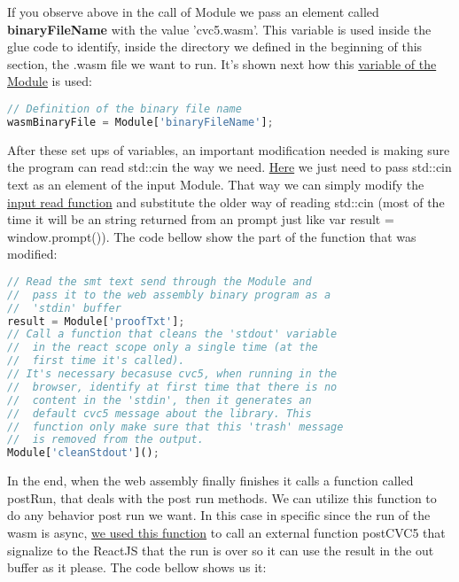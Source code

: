 \documentclass[12pt, a4paper]{article}
\begin{document}
If you observe above in the call of Module we pass an element called \textbf{binaryFileName} with the value ’cvc5.wasm’. This variable is used inside the glue code to identify, inside the directory we defined in the beginning of this section, the .wasm file we want to run. It's shown next how this  \href{https://github.com/ufmg-smite/proof-visualizer/blob/main/frontend/src/wasm/cvc5.js#L312-L313}{variable of the Module} is used: 

\begin{lstlisting}[language=JavaScript]
// Definition of the binary file name
wasmBinaryFile = Module['binaryFileName'];
\end{lstlisting}

After these set ups of variables, an important modification needed is making sure the program can read std::cin the way we need. \href{
https://github.com/ufmg-smite/proof-visualizer/blob/main/frontend/src/wasm/cvc5.js#L730-L743}{Here} we just need to pass std::cin text as an element of the input Module. That way we can simply modify the \href{https://github.com/ufmg-smite/proof-visualizer/blob/main/frontend/src/wasm/cvc5.js#L726}{input read function} and substitute the older way of reading std::cin (most of the time it will be an string returned from an prompt just like var result = window.prompt()). The code bellow show the part of the function that was modified:

\begin{lstlisting}[language=JavaScript]
// Read the smt text send through the Module and
//  pass it to the web assembly binary program as a
//  'stdin' buffer
result = Module['proofTxt'];
// Call a function that cleans the 'stdout' variable
//  in the react scope only a single time (at the
//  first time it's called).
// It's necessary becasuse cvc5, when running in the
//  browser, identify at first time that there is no
//  content in the 'stdin', then it generates an
//  default cvc5 message about the library. This
//  function only make sure that this 'trash' message
//  is removed from the output.
Module['cleanStdout']();
\end{lstlisting}

In the end, when the web assembly finally finishes it calls a function called postRun, that deals with the post run methods. We can utilize this function to do any behavior post run we want. In this case in specific since the run of the wasm is async, \href{https://github.com/ufmg-smite/proof-visualizer/blob/main/frontend/src/wasm/cvc5.js#L264-L270}{we used this function} to call an external function postCVC5 that signalize to the ReactJS that the run is over so it can use the result in the out buffer as it please. The code bellow shows us it: 
\end{document}
